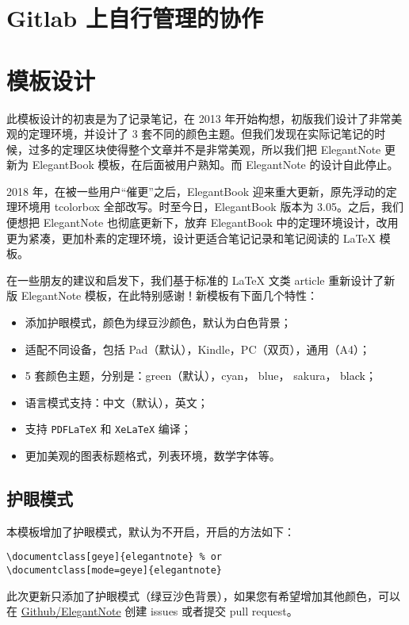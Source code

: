 \documentclass[cn,pad,11pt,green,geye]{../elegantnote}
\begin{document}
\section{Gitlab 上自行管理的协作}


\section{模板设计}
此模板设计的初衷是为了记录笔记，在 2013 年开始构想，初版我们设计了非常美观的定理环境，并设计了 3 套不同的颜色主题。但我们发现在实际记笔记的时候，过多的定理区块使得整个文章并不是非常美观，所以我们把 ElegantNote 更新为 ElegantBook 模板，在后面被用户熟知。而 ElegantNote 的设计自此停止。

2018 年，在被一些用户“催更”之后，ElegantBook 迎来重大更新，原先浮动的定理环境用 tcolorbox 全部改写。时至今日，ElegantBook 版本为 3.05。之后，我们便想把 ElegantNote 也彻底更新下，放弃 ElegantBook 中的定理环境设计，改用更为紧凑，更加朴素的定理环境，设计更适合笔记记录和笔记阅读的 \LaTeX{} 模板。

在一些朋友的建议和启发下，我们基于标准的 \LaTeX{} 文类 article 重新设计了新版 ElegantNote 模板，在此特别感谢！新模板有下面几个特性：
\begin{itemize}
\item 添加护眼模式，颜色为绿豆沙颜色，默认为白色背景；
\item 适配不同设备，包括 Pad（默认），Kindle，PC（双页），通用（A4）；
\item 5 套颜色主题，分别是：\textcolor{egreen}{green}（默认），\textcolor{ecyan}{cyan}， \textcolor{eblue}{blue}， \textcolor{sakura}{sakura}， \textcolor{black}{black}；
\item 语言模式支持：中文（默认），英文；
\item 支持 \lstinline{PDFLaTeX} 和 \lstinline{XeLaTeX} 编译；
\item 更加美观的图表标题格式，列表环境，数学字体等。
\end{itemize}

\subsection{护眼模式}
本模板增加了护眼模式，默认为不开启，开启的方法如下：
\begin{lstlisting}[frame=none]  
\documentclass[geye]{elegantnote} % or
\documentclass[mode=geye]{elegantnote}
\end{lstlisting}

\begin{remark}
此次更新只添加了护眼模式（绿豆沙色背景），如果您有希望增加其他颜色，可以在 \href{https://github.com/ElegantLaTeX/ElegantNote}{Github/ElegantNote} 创建 issues 或者提交 pull request。
\end{remark}
\end{document}
